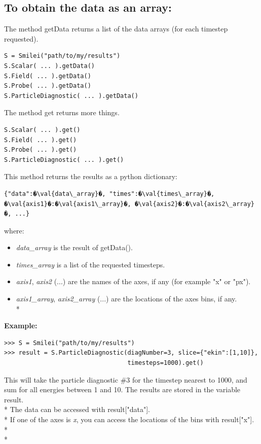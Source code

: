 \documentclass[11pt]{article}
\newcommand{\code}[1]{\colorbox{yellow!15}{\ttfamily #1}}
\newcommand{\val}[1]{{\ttfamily \textit{#1}}}
\begin{document}
\subsection{To obtain the data as an array:}
The method \code{getData} returns a list of the data arrays (for each timestep requested).
\begin{lstlisting}
S = Smilei("path/to/my/results")
S.Scalar( ... ).getData()
S.Field( ... ).getData()
S.Probe( ... ).getData()
S.ParticleDiagnostic( ... ).getData()
\end{lstlisting}

The method \code{get} returns more things.
\begin{lstlisting}
S.Scalar( ... ).get()
S.Field( ... ).get()
S.Probe( ... ).get()
S.ParticleDiagnostic( ... ).get()
\end{lstlisting}
This method returns the results as a python dictionary:
\begin{lstlisting}
{"data":�\val{data\_array}�, "times":�\val{times\_array}�, �\val{axis1}�:�\val{axis1\_array}�, �\val{axis2}�:�\val{axis2\_array}�, ...}
\end{lstlisting}
where:
\begin{itemize}
\item \val{data\_array} is the result of \code{getData()}.
\item \val{times\_array} is a list of the requested timesteps.
\item \val{axis1}, \val{axis2} (...) are the names of the axes, if any (for example \code{"x"} or \code{"px"}).
\item \val{axis1\_array}, \val{axis2\_array} (...) are the locations of the axes bins, if any.\\*
\end{itemize}

\textbf{Example:}
\begin{lstlisting}
>>> S = Smilei("path/to/my/results")
>>> result = S.ParticleDiagnostic(diagNumber=3, slice={"ekin":[1,10]},
                                  timesteps=1000).get()
\end{lstlisting}
This will take the particle diagnostic \#3 for the timestep nearest to 1000, and sum for all energies between 1 and 10.
The results are stored in the variable \code{result}.\\*
The data can be accessed with \code{result["data"]}.\\*
If one of the axes is \val{x}, you can access the locations of the bins with \code{result["x"]}.\\* \\*
\end{document}
